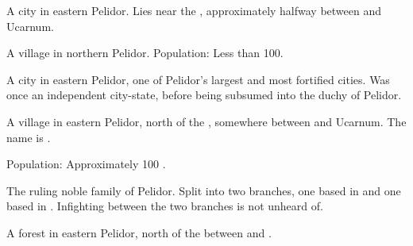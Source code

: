 \begin{gloss}
\begin{subgloss}
  \begin{comment}
  \subparagraph{Dendrum}
  \end{comment}
  A city in eastern Pelidor. 
  Lies near the , approximately halfway between  and {Ucarnum}. 





  \begin{comment}
  \subparagraph{Derwael}
  \end{comment}
  A \scathaese village in northern Pelidor.
  Population: Less than 100. 





  \begin{comment}
  \subparagraph{\Forklin}
  \end{comment}
  \gitem{\Forklin}
  \index{\Forklin}
  A city in eastern Pelidor, one of Pelidor's largest and most fortified cities. 
  Was once an independent city-state, before being subsumed into the duchy of Pelidor. 
  
  
  
  
  
  \begin{comment}
  \subparagraph{Gilwaed}
  \end{comment}
  A village in eastern Pelidor, north of the , somewhere between  and {Ucarnum}. 
  The name is \Tepharin. 
  
  Population: Approximately 100 \scathae. 
  
  
  
  
  
  \begin{comment}
  \subparagraph{House Pelidor}
  \end{comment}
  The ruling noble family of Pelidor. 
  Split into two branches, one based in  and one based in . 
  Infighting between the two branches is not unheard of. 
  
  
  
  
  
  \begin{comment}
  \subparagraph{Kenshaer}
  \end{comment}
  A  forest in eastern Pelidor, north of the  between \Forklin{} and . 
  

\end{subgloss}
\end{gloss}
